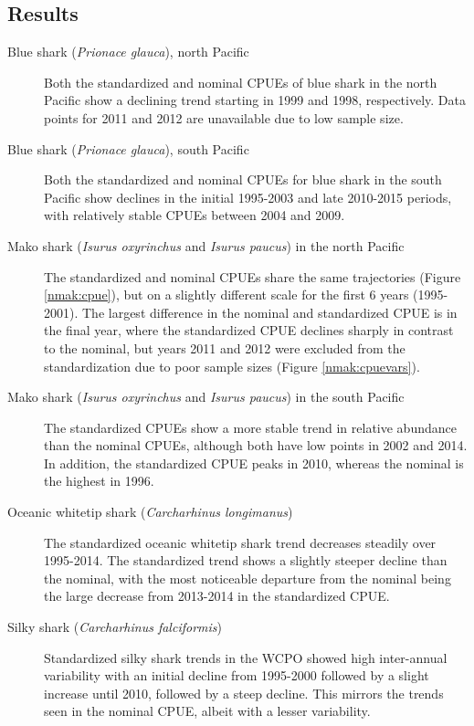 \subsection{Results}
\clearpage

 
\begin{description}
\item[Blue shark (\emph{Prionace glauca}), north Pacific] Both the standardized and nominal CPUEs of blue shark in the north Pacific show a declining trend starting in 1999 and 1998, respectively. Data points for 2011 and 2012 are unavailable due to low sample size.  
 
 \item[Blue shark (\emph{Prionace glauca}), south Pacific]  Both the standardized and nominal CPUEs for blue shark in the south Pacific show declines in the initial 1995-2003 and late 2010-2015 periods, with relatively stable CPUEs between 2004  and 2009.  
 
 \item[Mako shark (\emph{Isurus oxyrinchus} and \emph{Isurus paucus}) in the north Pacific] The standardized and nominal CPUEs share the same trajectories (Figure \ref{nmak:cpue}), but on a slightly different scale for the first 6 years (1995-2001).  The largest difference in the nominal and standardized CPUE is in the final year, where the standardized CPUE declines sharply in contrast to the nominal, but years 2011 and 2012 were excluded from the standardization due to poor sample sizes (Figure \ref{nmak:cpuevars}).
 
\item[Mako shark (\emph{Isurus oxyrinchus} and \emph{Isurus paucus}) in the south Pacific] The standardized CPUEs show a more stable trend in relative abundance than the nominal CPUEs, although both have low points in 2002 and 2014. In addition, the standardized CPUE peaks in 2010, whereas the nominal is the highest in 1996.  
 
\item[Oceanic whitetip shark (\emph{Carcharhinus longimanus})] The standardized oceanic whitetip shark trend decreases steadily over 1995-2014.  The standardized trend shows a slightly steeper decline than the nominal, with the most noticeable departure from the nominal being the large decrease from 2013-2014 in the standardized CPUE.%
 
 \item[Silky shark (\emph{Carcharhinus falciformis})] Standardized silky shark trends in the WCPO showed high inter-annual variability with an initial decline from 1995-2000 followed by a slight increase until 2010, followed by a steep decline. This mirrors the trends seen in the nominal CPUE, albeit with a lesser variability.
 

\end{description}
